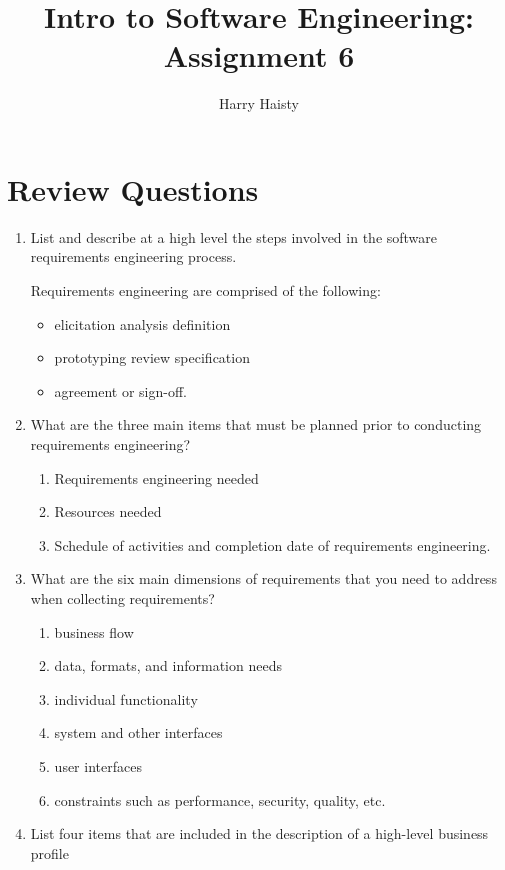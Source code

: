 \documentclass[11pt]{article}
\title{Intro to Software Engineering: Assignment 6}
\author{Harry Haisty}
\begin{document}
    \maketitle
    \section*{Review Questions}
    \begin{enumerate}
    
    \item List and describe at a high level the steps involved in the software requirements engineering process. 
    
    Requirements engineering are comprised of the following: 
    \begin{itemize}
        \item elicitation analysis definition
        \item prototyping review specification
        \item agreement or sign-off.
    \end{itemize}
    
    \item What are the three main items that must be planned prior to conducting requirements engineering?
    \begin{enumerate}
        \item Requirements engineering needed
        \item Resources needed
        \item Schedule of activities and completion date of requirements engineering.
    \end{enumerate}
    
    \item What are the six main dimensions of requirements that you need to address when collecting requirements?
    \begin{enumerate}
        \item business flow
        \item data, formats, and information needs
        \item individual functionality
        \item system and other interfaces
        \item user interfaces
        \item constraints such as performance, security, quality, etc.
    \end{enumerate}
    
    \item List four items that are included in the description of a high-level business profile
    

\end{enumerate}
\end{document}
